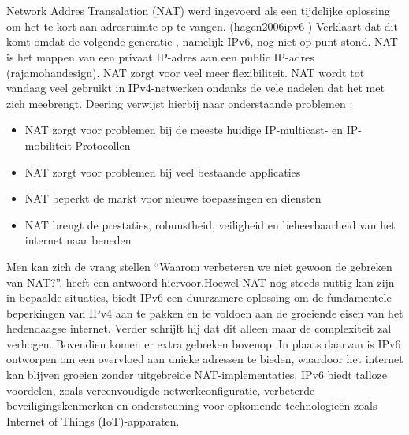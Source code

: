 \section{}%
\label{sec:Hoe kan je de problemen van IPv4 oplossen?}
Network Addres Transalation (NAT) werd ingevoerd als een tijdelijke oplossing om het te kort aan adresruimte op te vangen. (hagen2006ipv6 ) Verklaart dat dit komt omdat de volgende generatie , namelijk IPv6, nog niet op punt stond. NAT is het mappen van een privaat IP-adres aan een public IP-adres (rajamohandesign). NAT zorgt voor veel meer flexibiliteit. NAT wordt tot vandaag veel gebruikt in \newline IPv4-netwerken ondanks de vele nadelen dat het met zich meebrengt. Deering verwijst hierbij naar onderstaande problemen \autocite{deering2000ipv6}:

\begin{itemize}
    \item	NAT zorgt voor problemen bij de meeste huidige IP-multicast- en IP-mobiliteit Protocollen 
    \item	NAT zorgt voor problemen bij veel bestaande applicaties  
    \item	NAT beperkt de markt voor nieuwe toepassingen en diensten
    \item	NAT brengt de prestaties, robuustheid, veiligheid en beheerbaarheid van het internet naar beneden
\end{itemize}
Men kan zich de vraag stellen “Waarom verbeteren we niet gewoon de gebreken van NAT?”. \textcite{deering2000ipv6} heeft een antwoord hiervoor.Hoewel NAT nog steeds nuttig kan zijn in bepaalde situaties, biedt IPv6 een duurzamere oplossing om de fundamentele beperkingen van IPv4 aan te pakken en te voldoen aan de groeiende eisen van het hedendaagse internet. Verder schrijft hij dat dit alleen maar de complexiteit zal verhogen. Bovendien komen er extra gebreken bovenop. In plaats daarvan is IPv6 ontworpen om een overvloed aan unieke adressen te bieden, waardoor het internet kan blijven groeien zonder uitgebreide NAT-implementaties. IPv6 biedt talloze voordelen, zoals vereenvoudigde netwerkconfiguratie, verbeterde beveiligingskenmerken en ondersteuning voor opkomende technologieën zoals Internet of Things (IoT)-apparaten. \autocite{huston2000nat}

\section{}%
\label{sec:De weg naar IPv6?}

